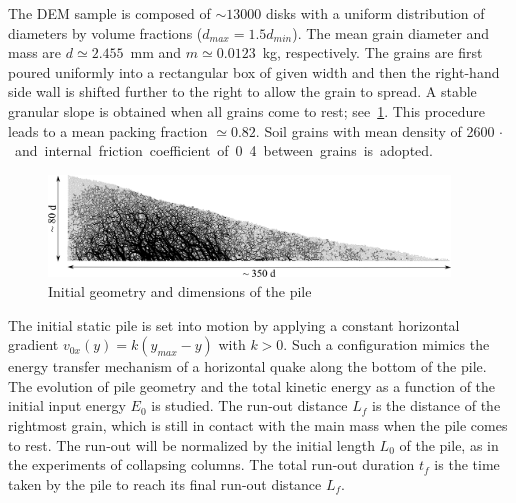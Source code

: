 The DEM sample is composed of $\sim13000$ disks with a uniform distribution of 
diameters by 
volume fractions ($d_{max} = 1.5 d_{min}$). The mean grain diameter and mass 
are $d\simeq 2.455 $~\si{\mm} and $m\simeq 0.0123$~\si{\kg}, respectively. The 
grains are first poured uniformly into a rectangular box of given width and 
then the right-hand side wall is shifted further to the right to allow the 
grain to spread. A stable granular slope is obtained when all grains come to 
rest; see~\cref{fig:slope_configuration}. This procedure leads to a mean 
packing 
fraction $\simeq 0.82$. Soil grains with mean density of 2600 
\si{\kg$\cdot$\per\m\cubed} and internal friction coefficient of 0.4 between 
grains 
is adopted.

\begin{figure}[tbph]
\includegraphics[width=0.95\textwidth]{slope_configuration}
\caption{Initial geometry and dimensions of the pile}
\label{fig:slope_configuration}
\end{figure}


The initial static pile is set into motion by applying a constant horizontal
gradient  $v_{0x}(y) = k (y_{max} - y)$ with $k>0$. Such a configuration 
mimics the energy transfer mechanism of a horizontal quake along the bottom of 
the pile. The evolution of pile geometry and the total kinetic energy as a 
function of the initial input energy $E_0$ is studied. The run-out distance 
$L_f$ is the distance of the rightmost grain, which is still in contact with 
the main mass when the pile comes to rest.  The run-out will be normalized by 
the initial length $L_0$ of the pile, as in the experiments of collapsing 
columns. The total run-out duration $t_f$ is the time taken by the pile to 
reach its final run-out distance $L_f$.

